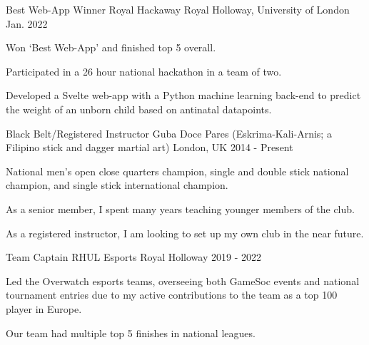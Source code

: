 


\begin{cventries}


\cventry
{Best Web-App Winner} %
{Royal Hackaway} %
{Royal Holloway, University of London} %
{Jan. 2022} %
{ %
\begin{cvitems}
\item {Won `Best Web-App' and finished top 5 overall.}
\item {Participated in a 26 hour national hackathon in a team of two.}
\item {Developed a Svelte web-app with a Python machine learning back-end to predict the weight of an unborn child based on antinatal datapoints.}
\end{cvitems}
}


\cventry
{Black Belt/Registered Instructor} %
{Guba Doce Pares \tiny{(Eskrima-Kali-Arnis; a Filipino stick and dagger martial art)}} %
{London, UK} %
{2014 - Present} %
{ %
\begin{cvitems}
\item {National men's open close quarters champion, single and double stick national champion, and single stick international champion.}
\item {As a senior member, I spent many years teaching younger members of the club.}
\item {As a registered instructor, I am looking to set up my own club in the near future.}
\end{cvitems}
}



\cventry
{Team Captain} %
{RHUL Esports} %
{Royal Holloway} %
{2019 - 2022} %
{ %
\begin{cvitems}
\item {Led the Overwatch esports teams, overseeing both GameSoc events and national tournament entries due to my active contributions to the team as a top 100 player in Europe.}
\item {Our team had multiple top 5 finishes in national leagues.}
\end{cvitems}
}


\end{cventries}
